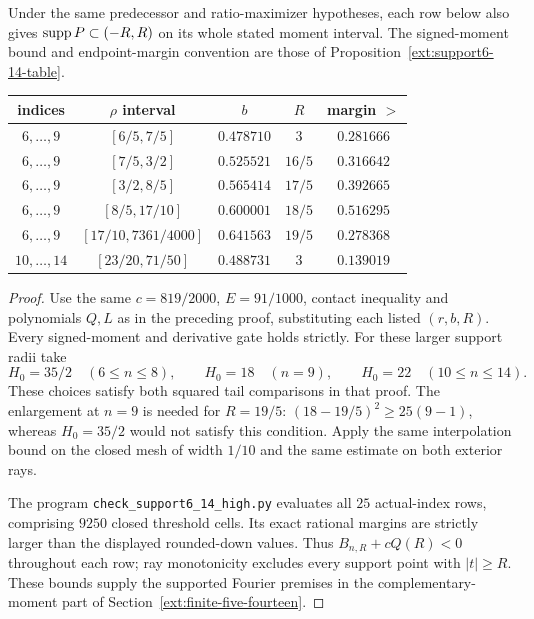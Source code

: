 \begin{proposition}
\label{ext:support6-14-high-table}
Under the same predecessor and ratio-maximizer hypotheses, each row below
also gives $\operatorname{supp} P\subset(-R,R)$ on its whole stated moment interval.
The signed-moment bound and endpoint-margin convention are those of
Proposition~\ref{ext:support6-14-table}.
\begin{center}\small
\begin{tabular}{@{}ccccc@{}}
\toprule
indices & $\rho$ interval & $b$ & $R$ & margin $>$\\
\midrule
$6,\ldots,9$ & $[6/5,7/5]$ & $0.478710$ & $3$ & $0.281666$\\
$6,\ldots,9$ & $[7/5,3/2]$ & $0.525521$ & $16/5$ & $0.316642$\\
$6,\ldots,9$ & $[3/2,8/5]$ & $0.565414$ & $17/5$ & $0.392665$\\
$6,\ldots,9$ & $[8/5,17/10]$ & $0.600001$ & $18/5$ & $0.516295$\\
$6,\ldots,9$ & $[17/10,7361/4000]$ & $0.641563$ & $19/5$ & $0.278368$\\
$10,\ldots,14$ & $[23/20,71/50]$ & $0.488731$ & $3$ & $0.139019$\\
\bottomrule
\end{tabular}
\end{center}
\end{proposition}
\begin{proof}
Use the same $c=819/2000$, $E=91/1000$, contact inequality and
polynomials $Q,L$ as in the preceding proof, substituting each listed
$(r,b,R)$. Every signed-moment and derivative gate holds strictly.
For these larger support radii take
\[
 H_0=35/2\quad(6\le n\le8),\qquad
 H_0=18\quad(n=9),\qquad H_0=22\quad(10\le n\le14).
\]
These choices satisfy both squared tail comparisons in that proof.
The enlargement at $n=9$ is needed for $R=19/5$:
$(18-19/5)^2\ge25(9-1)$, whereas $H_0=35/2$ would not satisfy
this condition. Apply the same interpolation bound on the closed
mesh of width $1/10$ and the same estimate on both exterior rays.

The program \texttt{check\_support6\_14\_high.py} evaluates all
$25$ actual-index rows, comprising $9250$ closed threshold cells.
Its exact rational margins are strictly larger than the displayed
rounded-down values. Thus $B_{n,R}+cQ(R)<0$ throughout each row;
ray monotonicity excludes every support point with $|t|\ge R$.
These bounds supply the supported Fourier premises in the
complementary-moment part of Section~\ref{ext:finite-five-fourteen}.
\end{proof}
